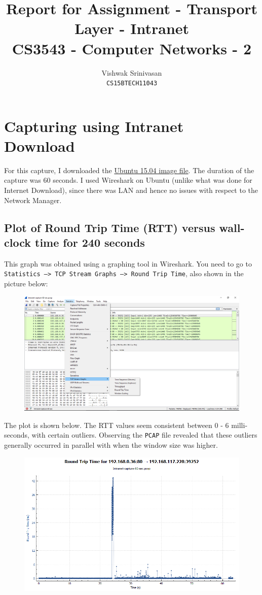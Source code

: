 \documentclass{article}
\title{Report for Assignment - Transport Layer - Intranet\\
CS3543 - Computer Networks - 2}
\author{Vishwak Srinivasan\\
\texttt{CS15BTECH11043}}
\date{}
\begin{document}
\maketitle 

\section{Capturing using Intranet Download}
\begin{flushleft}
For this capture, I downloaded the \href{http://intranet.iith.ac.in/files/os/ubuntu-15.04-desktop-amd64.iso}{Ubuntu 15.04 image file}. The duration of the capture was 60 seconds. I used Wireshark on Ubuntu (unlike what was done for Internet Download), since there was LAN and hence no issues with respect to the Network Manager.
\end{flushleft}

\subsection{Plot of Round Trip Time (RTT) versus wall-clock time for 240 seconds}
\begin{flushleft}
This graph was obtained using a graphing tool in Wireshark. You need to go to \texttt{Statistics --> TCP Stream Graphs --> Round Trip Time}, also shown in the picture below:
\begin{figure}[H]
\centering
\includegraphics[width=0.6\linewidth]{RTT-Window-size-capture-process-Intranet.png}
\end{figure}

The plot is shown below. The RTT values seem consistent between 0 - 6 milli-seconds, with certain outliers. Observing the \texttt{PCAP} file revealed that these outliers generally occurred in parallel with when the window size was higher.
\begin{figure}[H]
\centering
\includegraphics[width=0.65\linewidth]{RTT-variation-60-sec-capture-Ubuntu-time.png}
\end{figure}
\end{flushleft}
\end{document}
